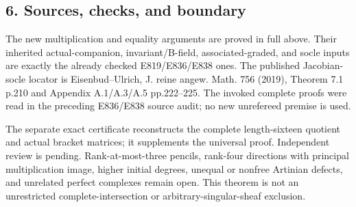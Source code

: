 \subsection{6. Sources, checks, and
boundary}\label{sources-checks-and-boundary}

The new multiplication and equality arguments are proved in full above.
Their inherited actual-companion, invariant/B-field, associated-graded,
and socle inputs are exactly the already checked E819/E836/E838 ones.
The published Jacobian-socle locator is Eisenbud--Ulrich, J. reine
angew. Math. 756 (2019), Theorem 7.1 p.210 and Appendix A.1/A.3/A.5
pp.222--225. The invoked complete proofs were read in the preceding
E836/E838 source audit; no new unrefereed premise is used.

The separate exact certificate reconstructs the complete length-sixteen
quotient and actual bracket matrices; it supplements the universal
proof. Independent review is pending. Rank-at-most-three pencils,
rank-four directions with principal multiplication image, higher initial
degrees, unequal or nonfree Artinian defects, and unrelated perfect
complexes remain open. This theorem is not an unrestricted
complete-intersection or arbitrary-singular-sheaf exclusion.
